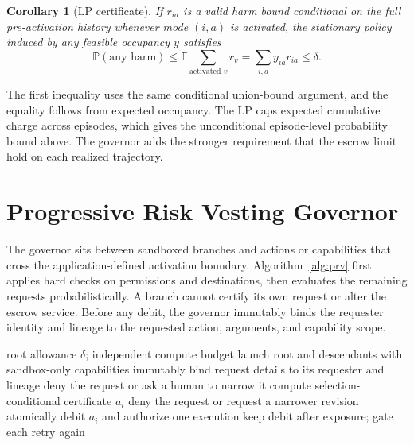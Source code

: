 \documentclass[sigconf,nonacm]{acmart}
\newtheorem{corollary}{Corollary}
\newcommand{\E}{\mathbb{E}}
\newcommand{\Prb}{\mathbb{P}}
\begin{document}
\begin{corollary}[LP certificate]
If $r_{ia}$ is a valid harm bound conditional on the full pre-activation history whenever mode
$(i,a)$ is activated, the stationary policy induced by any feasible occupancy $y$ satisfies
\[
 \Prb(\text{any harm})\leq \E\!\sum_{\text{activated }v}r_v
 =\sum_{i,a}y_{ia}r_{ia}\leq\delta.
\]
\end{corollary}

The first inequality uses the same conditional union-bound argument, and the equality follows
from expected occupancy.  The LP caps expected cumulative charge across episodes, which gives
the unconditional episode-level probability bound above.  The governor adds the stronger
requirement that the escrow limit hold on each realized trajectory.

\section{Progressive Risk Vesting Governor}

The governor sits between sandboxed branches and actions or capabilities that cross the
application-defined activation boundary.
Algorithm~\ref{alg:prv} first applies hard checks on permissions and destinations, then evaluates
the remaining requests probabilistically.  A branch cannot certify its own request or alter the
escrow service.  Before any debit, the governor immutably binds the requester identity and lineage
to the requested action, arguments, and capability scope.

\begin{algorithm}[t]
\caption{Progressive risk vesting at the capability-activation boundary}
\label{alg:prv}
\begin{algorithmic}[1]
\Require root allowance $\delta$; independent compute budget
\State launch root and descendants with sandbox-only capabilities
  \State immutably bind request details to its requester and lineage
    \State deny the request or ask a human to narrow it
  \Else
    \State compute selection-conditional certificate $a_i$
      \State deny the request or request a narrower revision
    \Else
      \State atomically debit $a_i$ and authorize one execution
      \State keep debit after exposure; gate each retry again
    \EndIf
  \EndIf
\EndFor
\end{algorithmic}
\end{algorithm}
\end{document}
